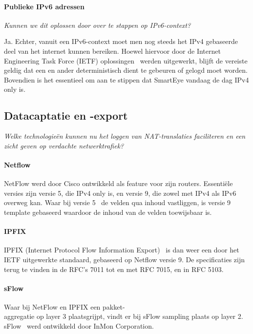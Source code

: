 \paragraph{Publieke IPv6 adressen}
\emph{Kunnen we dit oplossen door over te stappen op IPv6-context?}

Ja. Echter, vanuit een IPv6-context moet men nog steeds het IPv4 gebaseerde deel van het internet kunnen bereiken. Hoewel hiervoor door de Internet Engineering Task Force (IETF) oplossingen~\autocite{Arkko2011} werden uitgewerkt, blijft de vereiste geldig dat een en ander deterministisch dient te gebeuren of gelogd moet worden. Bovendien is het essentieel om aan te stippen dat SmartEye vandaag de dag IPv4 only is.

\subsection{Datacaptatie en -export}
\emph{Welke technologieën kunnen nu het loggen van NAT-translaties faciliteren en een zicht geven op verdachte netwerktrafiek?}

\paragraph{Netflow}
NetFlow werd door Cisco ontwikkeld als feature voor zijn routers. Essentiële versies zijn versie 5, die IPv4 only is, en versie 9, die zowel met IPv4 als IPv6 overweg kan. Waar bij versie 5~\autocite{Cisco2007} de velden qua inhoud vastliggen, is versie 9~\autocite{Claise2004} template gebaseerd waardoor de inhoud van de velden toewijsbaar is.
\paragraph{IPFIX}
IPFIX (Internet Protocol Flow Information Export)~\autocite{Aitken2013} is dan weer een door het IETF uitgewerkte standaard, gebaseerd op Netflow versie 9. De specificaties zijn terug te vinden in de RFC’s 7011 tot en met RFC 7015, en in RFC 5103.
\paragraph{sFlow}
Waar bij NetFlow en IPFIX een pakket-\\aggregatie op layer 3 plaatsgrijpt, vindt er bij sFlow sampling plaats op layer 2. sFlow~\autocite{Phaal2004} werd ontwikkeld door InMon Corporation.


